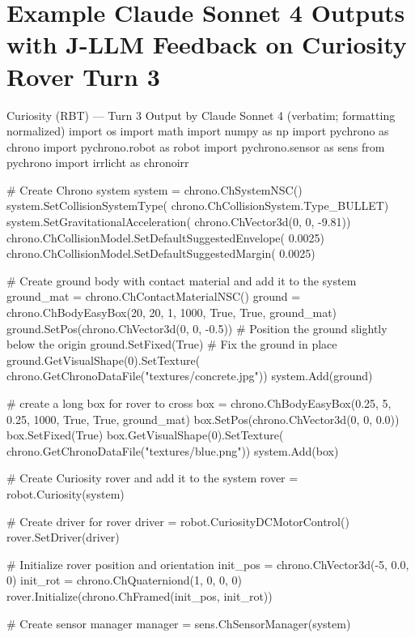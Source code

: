     \section{Example Claude Sonnet 4 Outputs with J-LLM Feedback on Curiosity Rover Turn 3}
    \label{app:claude_curiosity_turn3}
    \begin{CodeBlock}[breakable]{Curiosity (RBT) --- Turn 3 Output by Claude Sonnet 4 (verbatim; formatting normalized)}
      import os
      import math
      import numpy as np
      import pychrono as chrono
      import pychrono.robot as robot
      import pychrono.sensor as sens
      from pychrono import irrlicht as chronoirr
      
      # Create Chrono system
      system = chrono.ChSystemNSC()
      system.SetCollisionSystemType(
        chrono.ChCollisionSystem.Type_BULLET)
      system.SetGravitationalAcceleration(
        chrono.ChVector3d(0, 0, -9.81))
      chrono.ChCollisionModel.SetDefaultSuggestedEnvelope(
        0.0025)
      chrono.ChCollisionModel.SetDefaultSuggestedMargin(
        0.0025)
      
      # Create ground body with contact material and add it to the system
      ground_mat = chrono.ChContactMaterialNSC()
      ground = chrono.ChBodyEasyBox(20, 20, 1, 1000, True, True, ground_mat)
      ground.SetPos(chrono.ChVector3d(0, 0, -0.5))  # Position the ground slightly below the origin
      ground.SetFixed(True)  # Fix the ground in place
      ground.GetVisualShape(0).SetTexture(
        chrono.GetChronoDataFile("textures/concrete.jpg"))
      system.Add(ground)
      
      # create a long box for rover to cross
      box = chrono.ChBodyEasyBox(0.25, 5, 0.25, 1000, True, True, ground_mat)
      box.SetPos(chrono.ChVector3d(0, 0, 0.0))
      box.SetFixed(True)
      box.GetVisualShape(0).SetTexture(
        chrono.GetChronoDataFile("textures/blue.png"))
      system.Add(box)
      
      # Create Curiosity rover and add it to the system
      rover = robot.Curiosity(system)
      
      # Create driver for rover
      driver = robot.CuriosityDCMotorControl()
      rover.SetDriver(driver)
      
      # Initialize rover position and orientation
      init_pos = chrono.ChVector3d(-5, 0.0, 0)
      init_rot = chrono.ChQuaterniond(1, 0, 0, 0)
      rover.Initialize(chrono.ChFramed(init_pos, init_rot))
      
      # Create sensor manager
      manager = sens.ChSensorManager(system)
      

\end{CodeBlock}
